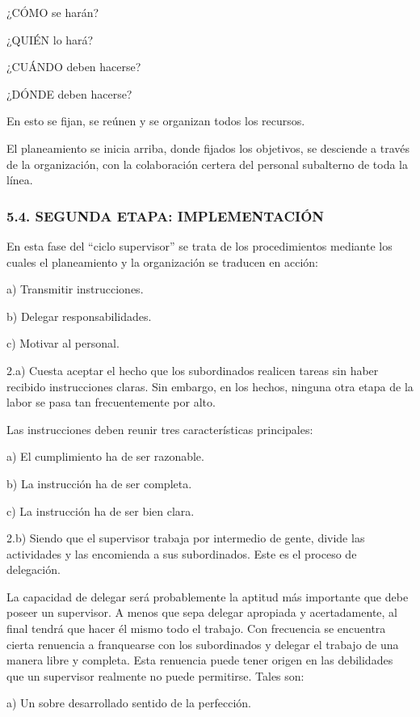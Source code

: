 ¿CÓMO se harán?

¿QUIÉN lo hará?

¿CUÁNDO deben hacerse?

¿DÓNDE deben hacerse?

En esto se fijan, se reúnen y se organizan todos los recursos.

El planeamiento se inicia arriba, donde fijados los objetivos, se desciende a través de la organización, con la colaboración certera del personal subalterno de toda la línea.

\subsubsection*{5.4. SEGUNDA ETAPA: IMPLEMENTACIÓN}
En esta fase del “ciclo supervisor” se trata de los procedimientos mediante los cuales el planeamiento y la organización se traducen en acción:

a) Transmitir instrucciones.

b) Delegar responsabilidades.

c) Motivar al personal.

2.a) Cuesta aceptar el hecho que los subordinados realicen tareas sin haber recibido instrucciones claras. Sin embargo, en los hechos, ninguna otra etapa de la labor se pasa tan frecuentemente por alto.

Las instrucciones deben reunir tres características principales:

a) El cumplimiento ha de ser razonable.

b) La instrucción ha de ser completa.

c) La instrucción ha de ser bien clara.



2.b) Siendo que el supervisor trabaja por intermedio de gente, divide las actividades y las encomienda a sus subordinados. Este es el proceso de delegación.

La capacidad de delegar será probablemente la aptitud más importante que debe poseer un supervisor. A menos que sepa delegar apropiada y acertadamente, al final tendrá que hacer él mismo todo el trabajo. Con frecuencia se encuentra cierta renuencia a franquearse con los subordinados y delegar el trabajo de una manera libre y completa. Esta renuencia puede tener origen en las debilidades que un supervisor realmente no puede permitirse. Tales son:

a) Un sobre desarrollado sentido de la perfección.

